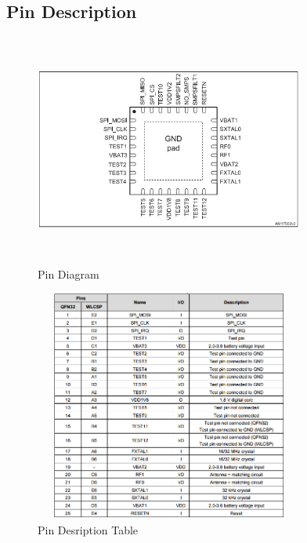 \subsection{Pin Description}
\begin{figure}[ht]
	\centering
	\includegraphics[width=3.5in, height=3in]{images/pin_diagram.png}
	\caption{Pin Diagram}
\end{figure}
\begin{figure}[ht]
	\centering
	\includegraphics[width=3.5in, height=3in]{images/pin_table1.png}
	\caption{Pin Desription Table}
\end{figure}
